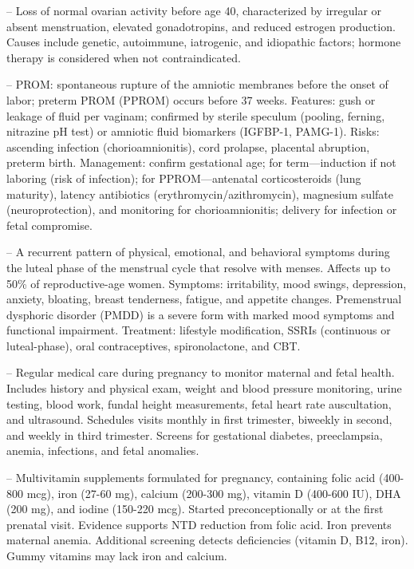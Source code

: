 -- Loss of normal ovarian activity before age 40, characterized by irregular or absent menstruation, elevated gonadotropins, and reduced estrogen production. Causes include genetic, autoimmune, iatrogenic, and idiopathic factors; hormone therapy is considered when not contraindicated.

-- PROM: spontaneous rupture of the amniotic membranes before the onset of labor; preterm PROM (PPROM) occurs before 37 weeks. Features: gush or leakage of fluid per vaginam; confirmed by sterile speculum (pooling, ferning, nitrazine pH test) or amniotic fluid biomarkers (IGFBP-1, PAMG-1). Risks: ascending infection (chorioamnionitis), cord prolapse, placental abruption, preterm birth. Management: confirm gestational age; for term—induction if not laboring (risk of infection); for PPROM—antenatal corticosteroids (lung maturity), latency antibiotics (erythromycin/azithromycin), magnesium sulfate (neuroprotection), and monitoring for chorioamnionitis; delivery for infection or fetal compromise.


-- A recurrent pattern of physical, emotional, and behavioral symptoms during the luteal phase of the menstrual cycle that resolve with menses. Affects up to 50\% of reproductive-age women. Symptoms: irritability, mood swings, depression, anxiety, bloating, breast tenderness, fatigue, and appetite changes. Premenstrual dysphoric disorder (PMDD) is a severe form with marked mood symptoms and functional impairment. Treatment: lifestyle modification, SSRIs (continuous or luteal-phase), oral contraceptives, spironolactone, and CBT.

-- Regular medical care during pregnancy to monitor maternal and fetal health. Includes history and physical exam, weight and blood pressure monitoring, urine testing, blood work, fundal height measurements, fetal heart rate auscultation, and ultrasound. Schedules visits monthly in first trimester, biweekly in second, and weekly in third trimester. Screens for gestational diabetes, preeclampsia, anemia, infections, and fetal anomalies.

-- Multivitamin supplements formulated for pregnancy, containing folic acid (400-800 mcg), iron (27-60 mg), calcium (200-300 mg), vitamin D (400-600 IU), DHA (200 mg), and iodine (150-220 mcg). Started preconceptionally or at the first prenatal visit. Evidence supports NTD reduction from folic acid. Iron prevents maternal anemia. Additional screening detects deficiencies (vitamin D, B12, iron). Gummy vitamins may lack iron and calcium.

